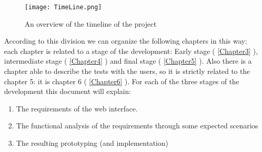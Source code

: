 \begin{figure}[H]
\centering
\texttt{[image: TimeLine.png]} 
\caption{An overview of the timeline of the project}
\end{figure}

According to this division we can organize the following chapters in this way:
each chapter is related to a stage of the development: Early stage (  \ref{Chapter3} ), intermediate stage ( \ref{Chapter4} ) and final stage ( \ref{Chapter5} ). Also there is a chapter able to describe the tests with the users, so it is strictly related to the chapter 5: it is chapter 6 ( \ref{Chapter6} ).
For each of the three stages of the development this document will explain:

\begin {enumerate}

\item
The requirements of the web interface.

\item
The functional analysis of the requirements through some expected scenarios

\item
The resulting prototyping (and implementation)  

\end {enumerate} 

